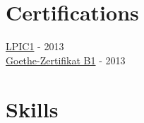 \documentclass[]{willianpaixao-resume}
\begin{document}
\begin{minipage}[t]{0.35\textwidth}

\section{Certifications}
\href{https://www.lpi.org/certification/get-certified-lpi/lpic-1-linux-server-professional/}{LPIC1} - 2013 \\
\href{https://www.goethe.de/en/spr/kup/prf/prf/gb1.html}{Goethe-Zertifikat B1} - 2013
\sectionsep


\section{Skills}

\end{minipage}
\end{document}
